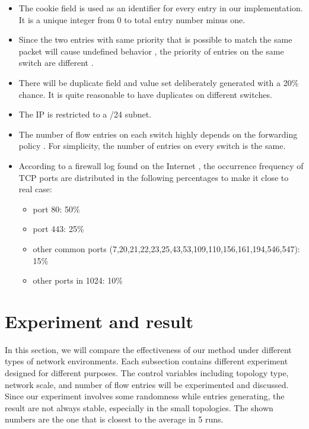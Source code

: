 \begin{itemize}
\item 
The cookie field is used as an identifier for every entry in our implementation. It is a unique integer from 0 to total entry number minus one.\sout{}
\item
Since the two entries with same priority that is possible to match the same packet will cause undefined behavior \cite{OF_SPEC}, the priority of entries on the same switch are different .
\item
There will be duplicate field and value set deliberately generated with a 20\% chance. It is quite reasonable to have duplicates on different switches. 
\item
The IP is restricted to a /24 subnet.
\item
The number of flow entries on each switch highly depends on the forwarding policy \cite{MPFHMRSV09}. For simplicity, the number of entries on every switch is the same. 
\item
According to a firewall log found on the Internet \cite{PORT_FREQ}, the occurrence frequency of TCP ports are distributed in the following percentages to make it close to real case:
\begin{itemize}
\item
port 80: 50\%
\item
port 443: 25\%
\item
other common ports (7,20,21,22,23,25,43,53,109,110,156,161,194,546,547): 15\%
\item
other ports in 1024: 10\%
\end{itemize}
\end{itemize}

\section{Experiment and result}
In this section, we will compare the effectiveness of our method under different types of network environments. Each subsection contains different experiment designed for different purposes. The control variables including topology type, network scale, and number of flow entries will be experimented and discussed. Since our experiment involves some randomness while entries generating, the result are not always stable, especially in the small topologies. The shown numbers are the one that is closest to the average in 5 runs.

